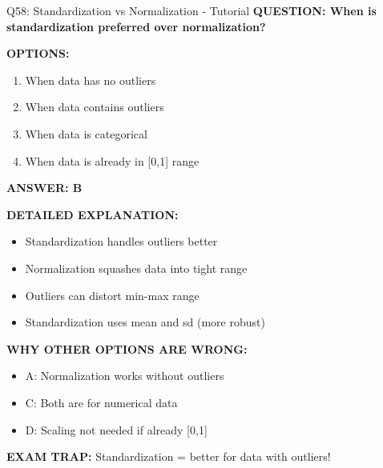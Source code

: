 \documentclass[8pt]{beamer}
\begin{document}
	\begin{frame}{Q58: Standardization vs Normalization - Tutorial}
		\fontsize{6.5}{7.5}\selectfont
		\textbf{QUESTION: When is standardization preferred over normalization?}
		
		\vspace{0.1cm}
		\textbf{OPTIONS:}
		\begin{enumerate}
			\item When data has no outliers
			\item When data contains outliers
			\item When data is categorical
			\item When data is already in [0,1] range
		\end{enumerate}
		
		\vspace{0.1cm}
		\textcolor{myblue}{\textbf{ANSWER: B}}
		
		\vspace{0.1cm}
		\textbf{DETAILED EXPLANATION:}
		\begin{itemize}
			\item Standardization handles outliers better
			\item Normalization squashes data into tight range
			\item Outliers can distort min-max range
			\item Standardization uses mean and sd (more robust)
		\end{itemize}
		
		\vspace{0.1cm}
		\textcolor{myred}{\textbf{WHY OTHER OPTIONS ARE WRONG:}}
		\begin{itemize}
			\item \textcolor{myred}{A:} Normalization works without outliers
			\item \textcolor{myred}{C:} Both are for numerical data
			\item \textcolor{myred}{D:} Scaling not needed if already [0,1]
		\end{itemize}
		
		\textcolor{myred}{\textbf{EXAM TRAP:}} Standardization = \textcolor{myblue}{better for data with outliers}!
	\end{frame}
	
\end{document}

